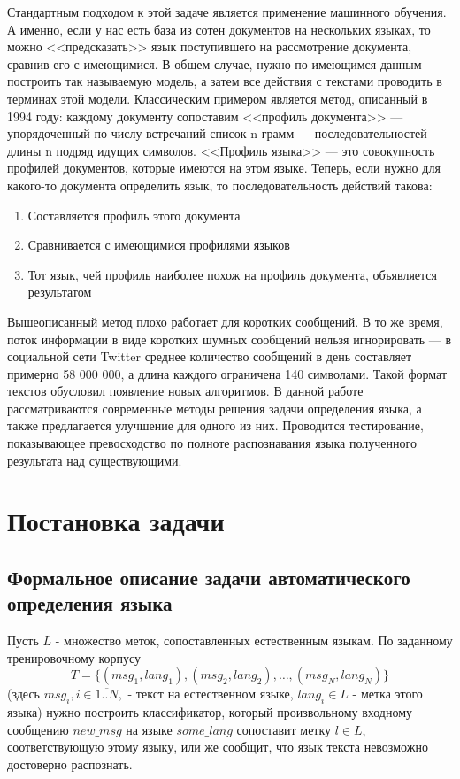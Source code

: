 \documentclass[a4paper, 14pt]{article}
\begin{document}
	        Стандартным подходом к этой задаче является применение машинного обучения. А именно, если у нас есть база из сотен документов 
	        на нескольких языках, то можно <<предсказать>> язык поступившего на рассмотрение документа, сравнив его с имеющимися. 
	        В общем случае, нужно по имеющимся данным построить так называемую модель, а затем все действия с текстами проводить в терминах 
	        этой модели. 
	        Классическим примером является метод, описанный в 1994 году: каждому документу сопоставим <<профиль документа>> --- упорядоченный по
	        числу встречаний список n-грамм --- последовательностей длины n подряд идущих символов. <<Профиль языка>> --- это совокупность профилей
	        документов, которые имеются на этом языке. Теперь, если нужно для какого-то документа определить язык, то последовательность
	        действий такова:
	        \begin{enumerate}
	        		\item Составляется профиль этого документа
	        		\item Сравнивается с имеющимися профилями языков
	        		\item Тот язык, чей профиль наиболее похож на профиль документа, объявляется результатом
	        \end{enumerate}
	          
	        Вышеописанный метод плохо работает для коротких сообщений. В то же время, поток информации в виде коротких шумных сообщений нельзя игнорировать ---
	        в социальной сети Twitter среднее количество сообщений в день составляет примерно 58 000 000, а длина каждого ограничена 140 символами. 
	        Такой формат текстов обусловил появление новых алгоритмов. В данной работе рассматриваются современные методы 
	        решения задачи определения языка, а также предлагается улучшение для одного из них. Проводится тестирование, показывающее
	        превосходство по полноте распознавания языка полученного результата над существующими.
  
	        
\section{Постановка задачи}
		\subsection{Формальное описание задачи автоматического определения языка}
		Пусть $L$ - множество меток, сопоставленных естественным языкам.
		По заданному тренировочному корпусу $$ T = \{(msg_{1}, lang_{1}), (msg_{2}, lang_{2}), \ldots, (msg_{N}, lang_{N}) \} $$
		(здесь $msg_{i}, i \in \overline{1..N},$ - текст на естественном языке, $lang_{i} \in L$ - метка этого языка) нужно построить классификатор,
		который произвольному входному сообщению $new\_msg$ на языке $some\_lang$ сопоставит метку $l \in L$, соответствующую этому языку,
		 или же сообщит, что язык текста невозможно достоверно распознать.
\end{document}
